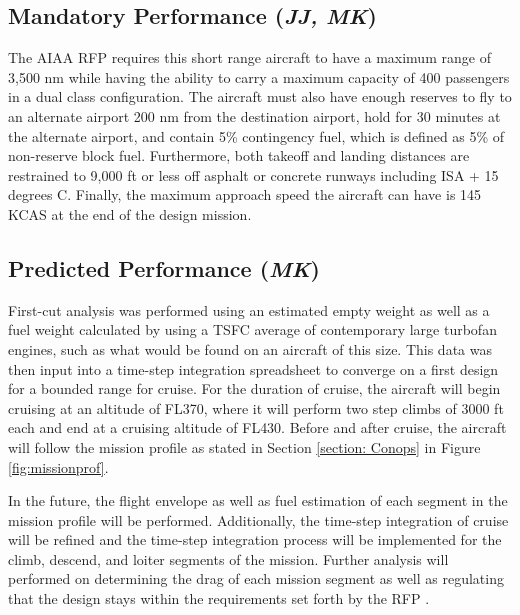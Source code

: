 \subsection{Mandatory Performance (\textit{JJ, MK})}
The AIAA RFP \cite{RFP} requires this short range aircraft to have a maximum range of 3,500 nm while having the ability to carry a maximum capacity of 400 passengers in a dual class configuration. The aircraft must also have enough reserves to fly to an alternate airport 200 nm from the destination airport, hold for 30 minutes at the alternate airport, and contain 5\% contingency fuel, which is defined as 5\% of non-reserve block fuel. Furthermore, both takeoff and landing distances are restrained to 9,000 ft or less off asphalt or concrete runways including ISA + 15 degrees C. Finally, the maximum approach speed the aircraft can have is 145 KCAS at the end of the design mission. 

\subsection{Predicted Performance (\textit{MK})}
First-cut analysis was performed using an estimated empty weight as well as a fuel weight calculated by using a TSFC average of contemporary large turbofan engines, such as what would be found on an aircraft of this size.  This data was then input into a time-step integration spreadsheet to converge on a first design for a bounded range for cruise. For the duration of cruise, the aircraft will begin cruising at an altitude of FL370, where it will perform two step climbs of 3000 ft each and end at a cruising altitude of FL430. Before and after cruise, the aircraft will follow the mission profile as stated in Section \ref{section: Conops} in Figure \ref{fig:missionprof}.

In the future, the flight envelope as well as fuel estimation of each segment in the mission profile will be performed. Additionally, the time-step integration of cruise will be refined and the time-step integration process will be implemented for the climb, descend, and loiter segments of the mission. Further analysis will performed on determining the drag of each mission segment as well as regulating that the design stays within the requirements set forth by the RFP \cite{RFP}. 

